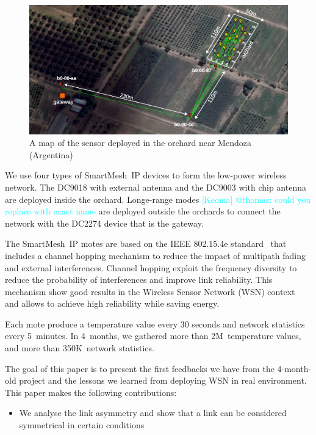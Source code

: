 \documentclass{sig-alternate}
\newcommand{\keoma}[1]              {\textcolor{cyan}{[Keoma] #1}}
\newcommand{\smip}                  {SmartMesh~IP\xspace}
\begin{document}
\begin{figure}
    \centering
    \includegraphics[width=\textwidth]{map_annotated}
    \caption{A map of the sensor deployed in the orchard near Mendoza (Argentina)}
    \label{fig:map}
\end{figure}


We use four types of \smip devices to form the low-power wireless network.
The DC9018 with external antenna and the DC9003 with chip antenna are deployed inside the orchard.
Longe-range modes \keoma{@thomas: could you replace with exact name} are deployed outside the orchards to connect the network with the DC2274 device that is the gateway.


The \smip motes are based on the IEEE 802.15.4e standard~\cite{std_ieee802154e} that includes a channel hopping mechanism to reduce the impact of multipath fading and external interferences.
Channel hopping exploit the frequency diversity to reduce the probability of interferences and improve link reliability.
This mechanism show good results in the Wireless Sensor Network (WSN) context~\cite{watteyne2010mitigating, watteyne2009reliability} and allows to achieve high reliability while saving energy.


Each mote produce a temperature value every 30 seconds and network statistics every 5~minutes.
In 4~months, we gathered more than 2M~temperature values, and more than 350K~network statistics.


The goal of this paper is to present the first feedbacks we have from the 4-month-old project and the lessons we learned from deploying WSN in real environment.
This paper makes the following contributions:
\begin{itemize}
    \item{We analyse the link asymmetry and show that a link can be considered symmetrical in certain conditions}
\end{itemize}
\end{document}
